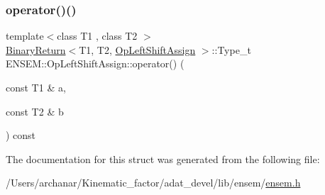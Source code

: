 \mbox{\label{structENSEM_1_1OpLeftShiftAssign_a777be5cb8e7641c4a6b448b0ccf1b745}} 
\subsubsection{\texorpdfstring{operator()()}{operator()()}\hspace{0.1cm}{\footnotesize\ttfamily [2/2]}}
{\footnotesize\ttfamily template$<$class T1 , class T2 $>$ \\
\mbox{\hyperlink{structENSEM_1_1BinaryReturn}{Binary\+Return}}$<$T1, T2, \mbox{\hyperlink{structENSEM_1_1OpLeftShiftAssign}{Op\+Left\+Shift\+Assign}} $>$\+::Type\+\_\+t E\+N\+S\+E\+M\+::\+Op\+Left\+Shift\+Assign\+::operator() (\begin{DoxyParamCaption}\item[{const T1 \&}]{a,  }\item[{const T2 \&}]{b }\end{DoxyParamCaption}) const\hspace{0.3cm}{\ttfamily [inline]}}



The documentation for this struct was generated from the following file\+:\begin{DoxyCompactItemize}
\item 
/\+Users/archanar/\+Kinematic\+\_\+factor/adat\+\_\+devel/lib/ensem/\mbox{\hyperlink{lib_2ensem_2ensem_8h}{ensem.\+h}}\end{DoxyCompactItemize}
